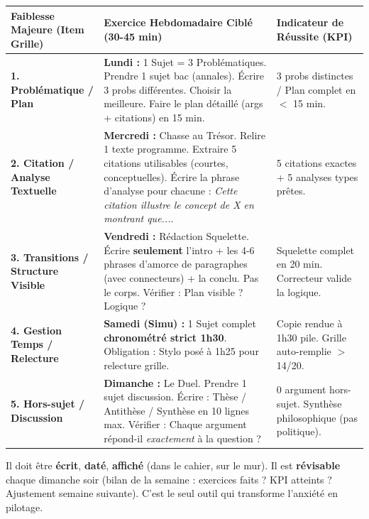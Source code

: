 \documentclass[11pt]{article}
\begin{document}
\begin{center}
\begin{tabularx}{\linewidth}{|l|X|X|}\hline
\textbf{Faiblesse Majeure (Item Grille)} & \textbf{Exercice Hebdomadaire Cibl\'e (30-45 min)} & \textbf{Indicateur de R\'eussite (KPI)} \\ \hline
\textbf{1. Probl\'ematique / Plan} & \textbf{Lundi :} \og{}1 Sujet = 3 Probl\'ematiques\fg{}. Prendre 1 sujet bac (annales). \'Ecrire 3 probs diff\'erentes. Choisir la meilleure. Faire le plan d\'etaill\'e (args + citations) en 15 min. & 3 probs distinctes / Plan complet en $<$ 15 min. \\ \hline
\textbf{2. Citation / Analyse Textuelle} & \textbf{Mercredi :} \og{}Chasse au Tr\'esor\fg{}. Relire 1 texte programme. Extraire 5 citations \og{}utilisables\fg{} (courtes, conceptuelles). \'Ecrire la phrase d'analyse pour chacune : \textit{\og{}Cette citation illustre le concept de X en montrant que...\fg{}}. & 5 citations exactes + 5 analyses types pr\^etes. \\ \hline
\textbf{3. Transitions / Structure Visible} & \textbf{Vendredi :} \og{}R\'edaction Squelette\fg{}. \'Ecrire \textbf{seulement} l'intro + les 4-6 phrases d'amorce de paragraphes (avec connecteurs) + la conclu. Pas le corps. V\'erifier : Plan visible ? Logique ? & Squelette complet en 20 min. Correcteur valide la logique. \\ \hline
\textbf{4. Gestion Temps / Relecture} & \textbf{Samedi (Simu) :} 1 Sujet complet \textbf{chronom\'etr\'e strict 1h30}. Obligation : Stylo pos\'e \`a 1h25 pour relecture grille. & Copie rendue \`a 1h30 pile. Grille auto-remplie $>$ 14/20. \\ \hline
\textbf{5. Hors-sujet / Discussion} & \textbf{Dimanche :} \og{}Le Duel\fg{}. Prendre 1 sujet discussion. \'Ecrire : Th\`ese / Antith\`ese / Synth\`ese en 10 lignes max. V\'erifier : Chaque argument r\'epond-il \emph{exactement} \`a la question ? & 0 argument hors-sujet. Synth\`ese philosophique (pas politique). \\ \hline
\end{tabularx}
\end{center}

\begin{aretenir}
Il doit \^etre \textbf{\'ecrit}, \textbf{dat\'e}, \textbf{affich\'e} (dans le cahier, sur le mur). Il est \textbf{r\'evisable} chaque dimanche soir (bilan de la semaine : exercices faits ? KPI atteints ? Ajustement semaine suivante). C'est le seul outil qui transforme l'anxi\'et\'e en pilotage.
\end{aretenir}
\end{document}
